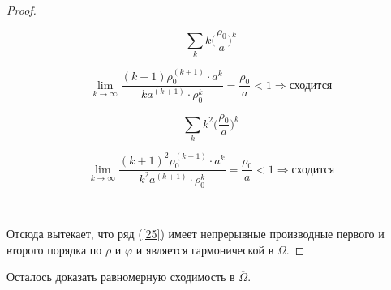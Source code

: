 \documentclass[14pt, a4paper]{extarticle}
\let\oldref\ref
\renewcommand{\ref}[1]{(\oldref{#1})}
\begin{document}
\begin{proof}
\begin{framed}
    		  		\begin{minipage}{0.20\textwidth}
						\[ \sum_{k} k \Big( \dfrac{\rho_0}{a} \Big)^k \]
					\end{minipage}
					\hfill
					\begin{minipage}{0.75\textwidth}
						\[ \lim_{k \rightarrow \infty} \dfrac{(k+1) \rho^{(k+1)}_0 \cdot a^k}{ka^{(k+1)} \cdot \rho^k_0} = \dfrac{\rho_0}{a} < 1  \Rightarrow \textit{сходится} \]
					\end{minipage}
					
    		  		\begin{minipage}{0.20\textwidth}
						\[ \sum_{k} k^2 \Big( \dfrac{\rho_0}{a} \Big)^k \]
					\end{minipage}
					\hfill
					\begin{minipage}{0.75\textwidth}
						\[ \lim_{k \rightarrow \infty} \dfrac{(k+1)^2 \rho^{(k+1)}_0 \cdot a^k}{k^2a^{(k+1)} \cdot \rho^k_0} = \dfrac{\rho_0}{a} < 1  \Rightarrow \textit{сходится} \]
					\end{minipage}\\
					\end{framed}
    		  	Отсюда вытекает, что ряд \ref{25} имеет непрерывные производные первого и второго порядка по $\rho$ и $\varphi$ и является гармонической в $\Omega$. 
    		  	\end{proof}
    		  	\noindent Осталось доказать равномерную сходимость в $\overline{\Omega}$. 
\end{document}
